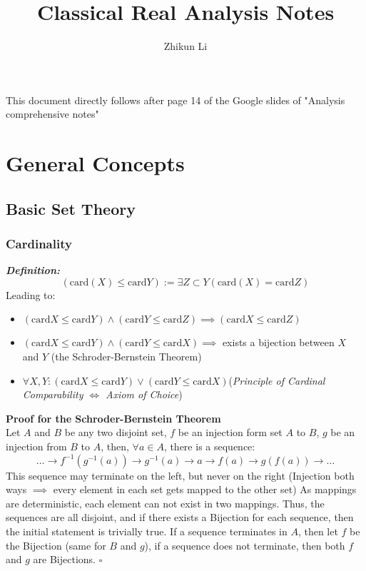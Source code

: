 \documentclass{article}
\title{Classical Real Analysis Notes}
\author{Zhikun Li}
\date{}
\newcommand{\0}{{\bf{0}}}
\begin{document}
\maketitle
This document directly follows after page 14 of the Google slides of "Analysis comprehensive notes"
\tableofcontents
\clearpage
\section{General Concepts}
\subsection{Basic Set Theory}
\subsubsection{Cardinality}
{\textit{\textbf{Definition:}}}
$$(\mbox{card}(X)\le\mbox{card}Y):=\exists{}Z\subset{}Y(\mbox{card}(X)=\mbox{card}Z)$$
Leading to:
\begin{itemize}
    \item $(\mbox{card}X\le\mbox{card}Y)\land(\mbox{card}Y\le\mbox{card}Z)\implies(\mbox{card}X\le\mbox{card}Z)$
    \item $(\mbox{card}X\le\mbox{card}Y)\land(\mbox{card}Y\le\mbox{card}X)\implies$ exists a bijection between $X$ and $Y$ (the Schroder-Bernstein Theorem)
    \item $\forall{}X,Y:(\mbox{card}X\le\mbox{card}Y)\lor(\mbox{card}Y\le\mbox{card}X)$({\textit{Principle of Cardinal Comparability $\iff$ Axiom of Choice}})
\end{itemize}
{\textbf{Proof for the Schroder-Bernstein Theorem}}\\
Let $A$ and $B$ be any two disjoint set, $f$ be an injection form set $A$ to $B$,  $g$ be an injection from $B$ to $A$, then, $\forall{}a\in{}A$, there is a sequence:
$$\dots\to{}f^{-1}(g^{-1}(a))\to{}g^{-1}(a)\to{}a\to{}f(a)\to{}g(f(a))\to\dots$$
This sequence may terminate on the left, but never on the right (Injection both ways $\implies$ every element in each set gets mapped to the other set)
As mappings are deterministic, each element can not exist in two mappings. Thus, the sequences are all disjoint, and if there exists a Bijection for each sequence, then the initial statement is trivially true.
If a sequence terminates in $A$, then let $f$ be the Bijection (same for $B$ and $g$), if a sequence does not terminate, then both $f$ and $g$ are Bijections. $\square$
\end{document}
